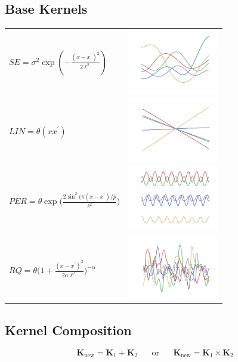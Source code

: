 \documentclass[a0,portrait]{a0poster}
\begin{document}
\begin{multicols}{3}
\subsection*{Base Kernels}
 \begin{center} 
\begin{tabular}{m{11.5cm} m{4cm}}
$SE = \sigma^2 \exp(-\frac{(x-x^\prime)^2}{2\ell^2})$&\includegraphics[width=4cm]{gpSamples/se.png}\\
$LIN = \theta (x x^\prime)$&\includegraphics[width=4cm]{gpSamples/lin.png}\\
$PER = \theta \exp \bigg( \frac{2 \sin^2 ( \pi (x - x^\prime)/p}{\ell^2} \bigg)$&\includegraphics[width=4cm]{gpSamples/per.png}\\
$RQ =   \theta \bigg(1 + \frac{(x - x^\prime)^2}{2 \alpha \ell^2} \bigg)^{-\alpha}$&\includegraphics[width=4cm]{gpSamples/rq.png}
\end{tabular}
\end{center}
\subsection*{Kernel Composition}
\begin{equation*}
\mathbf{K}_{\textrm{new}} = \mathbf{K}_1 + \mathbf{K}_2 \;\;\;\;\;\;\text{or}\;\;\;\;\;\; \mathbf{K}_{\textrm{new}} = \mathbf{K}_1 \times \mathbf{K}_2 
\end{equation*}


\end{multicols}
\end{document}
